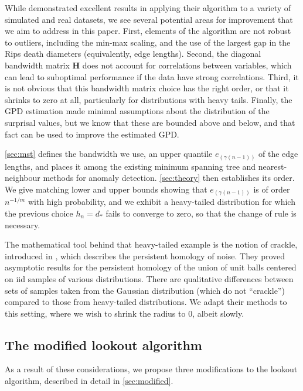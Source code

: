 While \citet{lookout} demonstrated excellent results in applying their algorithm to a variety of simulated and real datasets, we see several potential areas for improvement that we aim to address in this paper. First, elements of the algorithm are not robust to outliers, including the min-max scaling, and the use of the largest gap in the Rips death diameters (equivalently, edge lengths). Second, the diagonal bandwidth matrix $\bm{H}$ does not account for correlations between variables, which can lead to suboptimal performance if the data have strong correlations. Third, it is not obvious that this bandwidth matrix choice has the right order, or that it shrinks to zero at all, particularly for distributions with heavy tails. Finally, the GPD estimation made minimal assumptions about the distribution of the surprisal values, but we know that these are bounded above and below, and that fact can be used to improve the estimated GPD.

\cref{sec:mst} defines the bandwidth we use, an upper quantile $e_{(\gamma(n-1))}$ of the edge lengths, and places it among the existing minimum spanning tree and nearest-neighbour methods for anomaly detection. \cref{sec:theory} then establishes its order. We give matching lower and upper bounds showing that $e_{(\gamma(n-1))}$ is of order $n^{-1/m}$ with high probability, and we exhibit a heavy-tailed distribution for which the previous choice $h_n=d_*$ fails to converge to zero, so that the change of rule is necessary.

The mathematical tool behind that heavy-tailed example is the notion of crackle, introduced in \cite{Crackle}, which describes the persistent homology of noise. They proved asymptotic results for the persistent homology of the union of unit balls centered on iid samples of various distributions. There are qualitative differences between sets of samples taken from the Gaussian distribution (which do not ``crackle'') compared to those from heavy-tailed distributions. We adapt their methods to this setting, where we wish to shrink the radius to $0$, albeit slowly.


\subsection{The modified lookout algorithm}

As a result of these considerations, we propose three modifications to the lookout algorithm, described in detail in \cref{sec:modified}.

